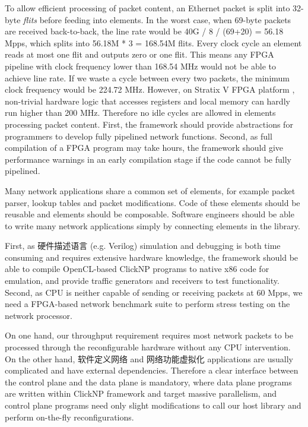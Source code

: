 { To allow efficient processing of packet content, an Ethernet packet is split into 32-byte \textit{flits} before feeding into elements. In the worst case, when 69-byte packets are received back-to-back, the line rate would be 40G / 8 / (69+20) = 56.18 Mpps, which splits into 56.18M * 3 = 168.54M flits. Every clock cycle an element reads at most one flit and outputs zero or one flit. This means any FPGA pipeline with clock frequency lower than 168.54 MHz would not be able to achieve line rate. If we waste a cycle between every two packets, the minimum clock frequency would be 224.72 MHz. However, on Stratix V FPGA platform \cite{stratix2012device}, non-trivial hardware logic that accesses registers and local memory can hardly run higher than 200 MHz. Therefore no idle cycles are allowed in elements processing packet content. First, the framework should provide abstractions for programmers to develop fully pipelined network functions. Second, as full compilation of a FPGA program may take hours, the framework should give performance warnings in an early compilation stage if the code cannot be fully pipelined.

 Many network applications share a common set of elements, for example packet parser, lookup tables and packet modifications. Code of these elements should be reusable and elements should be composable. Software engineers should be able to write many network applications simply by connecting elements in the library.

 First, as 硬件描述语言 (e.g. Verilog) simulation and debugging is both time consuming and requires extensive hardware knowledge, the framework should be able to compile OpenCL-based ClickNP programs to native x86 code for emulation, and provide traffic generators and receivers to test functionality. Second, as CPU is neither capable of sending or receiving packets at 60 Mpps, we need a FPGA-based network benchmark suite to perform stress testing on the network processor.

 On one hand, our throughput requirement requires most network packets to be processed through the reconfigurable hardware without any CPU intervention. On the other hand, 软件定义网络 and 网络功能虚拟化 applications are usually complicated and have external dependencies. Therefore a clear interface between the control plane and the data plane is mandatory, where data plane programs are written within ClickNP framework and target massive parallelism, and control plane programs need only slight modifications to call our host library and perform on-the-fly reconfigurations.

}
